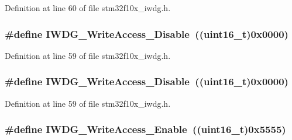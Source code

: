 Definition at line 60 of file stm32f10x\+\_\+iwdg.\+h.

\subsubsection[{\texorpdfstring{I\+W\+D\+G\+\_\+\+Write\+Access\+\_\+\+Disable}{IWDG_WriteAccess_Disable}}]{\setlength{\rightskip}{0pt plus 5cm}\#define I\+W\+D\+G\+\_\+\+Write\+Access\+\_\+\+Disable~(({\bf uint16\+\_\+t})0x0000)}\hypertarget{group___i_w_d_g___write_access_ga4b395cf5b2d7ab18fc71a5f779f758cc}{}\label{group___i_w_d_g___write_access_ga4b395cf5b2d7ab18fc71a5f779f758cc}


Definition at line 59 of file stm32f10x\+\_\+iwdg.\+h.

\subsubsection[{\texorpdfstring{I\+W\+D\+G\+\_\+\+Write\+Access\+\_\+\+Disable}{IWDG_WriteAccess_Disable}}]{\setlength{\rightskip}{0pt plus 5cm}\#define I\+W\+D\+G\+\_\+\+Write\+Access\+\_\+\+Disable~(({\bf uint16\+\_\+t})0x0000)}\hypertarget{group___i_w_d_g___write_access_ga4b395cf5b2d7ab18fc71a5f779f758cc}{}\label{group___i_w_d_g___write_access_ga4b395cf5b2d7ab18fc71a5f779f758cc}


Definition at line 59 of file stm32f10x\+\_\+iwdg.\+h.

\subsubsection[{\texorpdfstring{I\+W\+D\+G\+\_\+\+Write\+Access\+\_\+\+Enable}{IWDG_WriteAccess_Enable}}]{\setlength{\rightskip}{0pt plus 5cm}\#define I\+W\+D\+G\+\_\+\+Write\+Access\+\_\+\+Enable~(({\bf uint16\+\_\+t})0x5555)}\hypertarget{group___i_w_d_g___write_access_ga86f4b926f4351e19ea069f98c2e65f91}{}\label{group___i_w_d_g___write_access_ga86f4b926f4351e19ea069f98c2e65f91}


